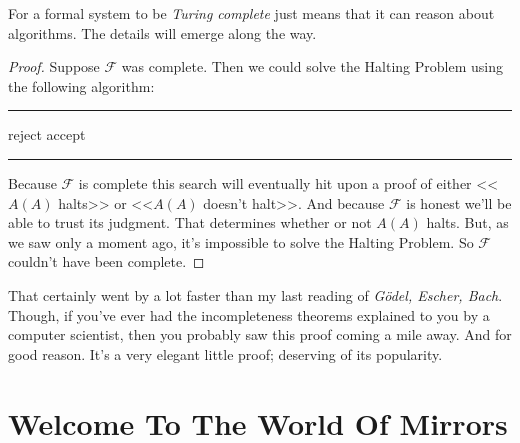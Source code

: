 \documentclass{article}
\theoremstyle{customstyle}
\newcommand{\F}{\ensuremath{\mathcal{F}}}
\newenvironment{algo}{\begin{samepage}\medskip\hrule\begin{algorithmic}}{\end{algorithmic}\hrule\medskip\end{samepage}}
\begin{document}
For a formal system to be \textit{Turing complete} just means that it can reason about algorithms. The details will emerge along the way.

\begin{proof}
Suppose $\F$ was complete. Then we could solve the Halting Problem using the following algorithm:
\begin{algo}
      \State reject
    \EndIf
      \State accept
    \EndIf
  \EndFor
\EndFunction
\end{algo}
Because $\F$ is complete this search will eventually hit upon a proof of  either <<$A(A)$ halts>> or <<$A(A)$ doesn't halt>>. And because $\F$ is honest we'll be able to trust its judgment. That determines whether or not $A(A)$ halts. But, as we saw only a moment ago, it's impossible to solve the Halting Problem. So $\F$ couldn't have been complete. \lightning
\end{proof}

That certainly went by a lot faster than my last reading of \textit{Gödel, Escher, Bach}. Though, if you've ever had the incompleteness theorems explained to you by a computer scientist, then you probably saw this proof coming a mile away. And for good reason. It's a very elegant little proof; deserving of its popularity.

\section{Welcome To The World Of Mirrors}
\end{document}
